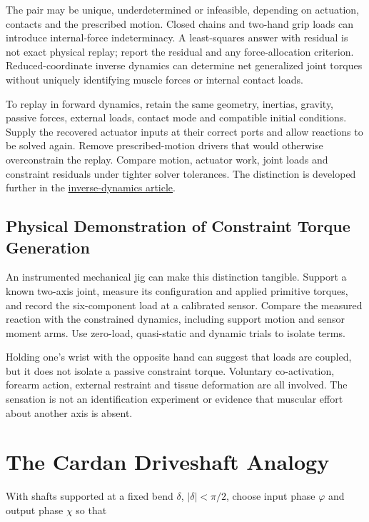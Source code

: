 \documentclass[
  11pt,
]{article}
\begin{document}
The pair may be unique, underdetermined or infeasible, depending on
actuation, contacts and the prescribed motion. Closed chains and
two-hand grip loads can introduce internal-force indeterminacy. A
least-squares answer with residual is not exact physical replay; report
the residual and any force-allocation criterion. Reduced-coordinate
inverse dynamics can determine net generalized joint torques without
uniquely identifying muscle forces or internal contact loads.

To replay in forward dynamics, retain the same geometry, inertias,
gravity, passive forces, external loads, contact mode and compatible
initial conditions. Supply the recovered actuator inputs at their
correct ports and allow reactions to be solved again. Remove
prescribed-motion drivers that would otherwise overconstrain the replay.
Compare motion, actuator work, joint loads and constraint residuals
under tighter solver tolerances. The distinction is developed further in
the
\href{https://affinedrift.com/articles/inverse-dynamics.html}{inverse-dynamics
article}.

\subsection{Physical Demonstration of Constraint Torque
Generation}\label{physical-demonstration-of-constraint-torque-generation}

An instrumented mechanical jig can make this distinction tangible.
Support a known two-axis joint, measure its configuration and applied
primitive torques, and record the six-component load at a calibrated
sensor. Compare the measured reaction with the constrained dynamics,
including support motion and sensor moment arms. Use zero-load,
quasi-static and dynamic trials to isolate terms.

Holding one's wrist with the opposite hand can suggest that loads are
coupled, but it does not isolate a passive constraint torque. Voluntary
co-activation, forearm action, external restraint and tissue deformation
are all involved. The sensation is not an identification experiment or
evidence that muscular effort about another axis is absent.

\section{The Cardan Driveshaft
Analogy}\label{the-cardan-driveshaft-analogy}

With shafts supported at a fixed bend \(\delta\), \(|\delta|<\pi/2\),
choose input phase \(\varphi\) and output phase \(\chi\) so that
\end{document}
